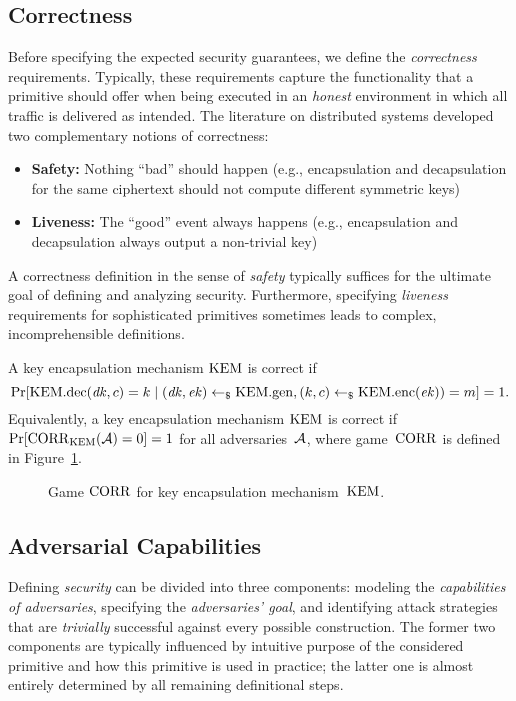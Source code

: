 \subsection{Correctness}
Before specifying the expected security guarantees, we define the \emph{correctness} requirements.
Typically, these requirements capture the functionality that a primitive should offer when being executed in an \emph{honest} environment in which all traffic is delivered as intended.
The literature on distributed systems developed two complementary notions of correctness:
\begin{itemize}
    \item \textbf{Safety:} Nothing ``bad'' should happen (e.g., encapsulation and decapsulation for the same ciphertext should not compute different symmetric keys)
    \item \textbf{Liveness:} The ``good'' event always happens (e.g., encapsulation and decapsulation always output a non-trivial key)
\end{itemize}

A correctness definition in the sense of \emph{safety} typically suffices for the ultimate goal of defining and analyzing security.
Furthermore, specifying \emph{liveness} requirements for sophisticated primitives sometimes leads to complex, incomprehensible definitions.

A key encapsulation mechanism $\mathrm{KEM}$ is correct if
\[
\Pr[\mathrm{KEM}.\mathrm{dec}(\mathit{dk},c)=k\mid (\mathit{dk},\mathit{ek})\gets_\$\mathrm{KEM}.\mathrm{gen},(k,c)\gets_\$\mathrm{KEM}.\mathrm{enc}(\mathit{ek}))=m]=1\text{.}
\]
Equivalently, a key encapsulation mechanism $\mathrm{KEM}$ is correct if $\Pr[\mathrm{CORR}_{\mathrm{KEM}}(\mathcal{A})=0]=1$ for all adversaries~$\mathcal{A}$, where game~$\mathrm{CORR}$ is defined in Figure~\ref{fig:kem:corr}.

\begin{figure}[!ht]
    \centering
    \nicoresetlinenr%
    \fbox{%
        \scalebox{\codescalefactor}{%
        }%
    }
    \caption{%
        Game $\mathrm{CORR}$ for key encapsulation mechanism~$\mathrm{KEM}$.
    }
    \label{fig:kem:corr}
\end{figure}

\subsection{Adversarial Capabilities}
Defining \emph{security} can be divided into three components:
modeling the \emph{capabilities of adversaries},
specifying the \emph{adversaries' goal}, and
identifying attack strategies that are \emph{trivially} successful against every possible construction.
The former two components are typically influenced by intuitive purpose of the considered primitive and how this primitive is used in practice;
the latter one is almost entirely determined by all remaining definitional steps.

